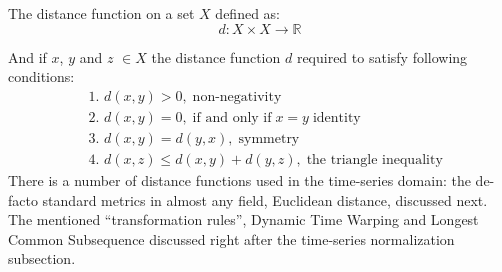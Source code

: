 The distance function on a set $X$ defined as:
\begin{equation}
 d: X \times X \rightarrow \mathbb{R}
\end{equation}

And if $x$, $y$ and $z$ $\in X$ the distance function $d$ required to satisfy following conditions:
\begin{align}
 & \text{1. } d(x, y) > 0, \; \text{non-negativity} \label{eq:d1} \\
 & \text{2. } d(x, y) = 0, \; \text{if and only if} \; x = y  \;  \text{identity} \\
 & \text{3. } d(x, y) = d(y, x), \; \text{symmetry} \\
 & \text{4. } d(x, z) \leq d(x, y) + d(y, z), \; \text{the triangle inequality} \label{eq:d4}
\end{align}
There is a number of distance functions used in the time-series domain: the de-facto standard metrics in almost any field, Euclidean distance, discussed next. The mentioned ``transformation rules'', Dynamic Time Warping and Longest Common Subsequence discussed right after the time-series normalization subsection.
